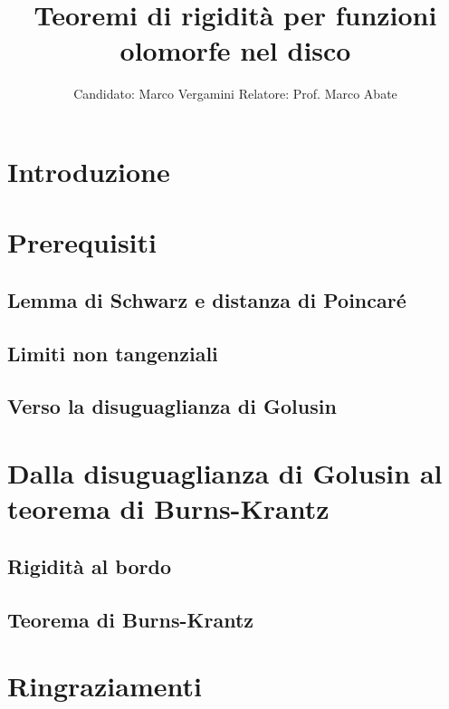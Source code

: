 \documentclass{article}
\title{Teoremi di rigidità per funzioni olomorfe nel disco}
\date{}
\author{Candidato: Marco Vergamini \qquad Relatore: Prof. Marco Abate}
\begin{document}
\maketitle
\newpage
\tableofcontents
\newpage


\section*{Introduzione}


\newpage

\section{Prerequisiti}

\subsection{Lemma di Schwarz e distanza di Poincaré}


\subsection{Limiti non tangenziali}


\subsection{Verso la disuguaglianza di Golusin}


\newpage

\section{Dalla disuguaglianza di Golusin al teorema di Burns-Krantz}

\subsection{Rigidità al bordo}


\subsection{Teorema di Burns-Krantz}


\newpage



\section*{Ringraziamenti}

\end{document}
